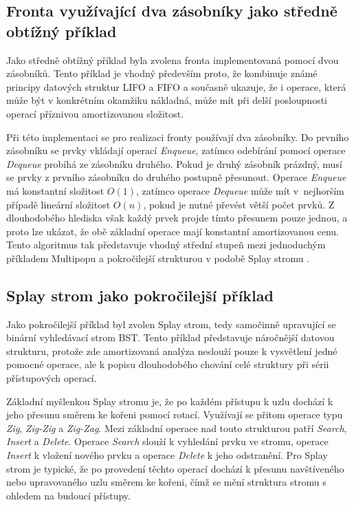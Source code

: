 \subsection{Fronta využívající dva zásobníky jako středně obtížný příklad}
Jako středně obtížný příklad byla zvolena fronta implementovaná pomocí dvou zásobníků. Tento příklad je vhodný především proto, že kombinuje známé principy datových struktur LIFO a FIFO a současně ukazuje, že i operace, která může být v konkrétním okamžiku nákladná, může mít při delší posloupnosti operací příznivou amortizovanou složitost.

Při této implementaci se pro realizaci fronty používají dva zásobníky. Do prvního zásobníku se prvky vkládají operací \textit{Enqueue}, zatímco odebírání pomocí operace \textit{Dequeue} probíhá ze zásobníku druhého. Pokud je druhý zásobník prázdný, musí se prvky z prvního zásobníku do druhého postupně přesunout. Operace \textit{Enqueue} má konstantní složitost \(O(1)\), zatímco operace \textit{Dequeue} může mít v~nejhorším případě lineární složitost \(O(n)\), pokud je nutné převést větší počet prvků. Z dlouhodobého hlediska však každý prvek projde tímto přesunem pouze jednou, a proto lze ukázat, že obě základní operace mají konstantní amortizovanou cenu. Tento algoritmus tak představuje vhodný střední stupeň mezi jednoduchým příkladem Multipopu a pokročilejší strukturou v podobě Splay stromu \cite{pucella_queue_two_stacks}.

\subsection{Splay strom jako pokročilejší příklad}
Jako pokročilejší příklad byl zvolen Splay strom, tedy samočinně upravující se binární vyhledávací strom BST. Tento příklad představuje náročnější datovou strukturu, protože zde amortizovaná analýza neslouží pouze k vysvětlení jedné pomocné operace, ale k popisu dlouhodobého chování celé struktury při sérii přístupových operací.

Základní myšlenkou Splay stromu je, že po každém přístupu k uzlu dochází k jeho přesunu směrem ke kořeni pomocí rotací. Využívají se přitom operace typu \textit{Zig}, \textit{Zig-Zig} a \textit{Zig-Zag}. Mezi základní operace nad touto strukturou patří \textit{Search}, \textit{Insert} a \textit{Delete}. Operace \textit{Search} slouží k vyhledání prvku ve stromu, operace \textit{Insert} k vložení nového prvku a operace \textit{Delete} k jeho odstranění. Pro Splay strom je typické, že po provedení těchto operací dochází k přesunu navštíveného nebo upravovaného uzlu směrem ke kořeni, čímž se mění struktura stromu s ohledem na budoucí přístupy.

